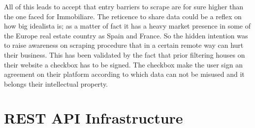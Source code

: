 \documentclass[
  12pt,
  a4paper,
  oneside]{book}
\theoremstyle{definition}
\theoremstyle{definition}
\theoremstyle{definition}
\theoremstyle{remark}
\begin{document}
All of this leads to accept that entry barriers to scrape are for sure higher than the one faced for Immobiliare. The reticence to share data could be a reflex on how big idealista is; as a matter of fact it has a heavy market presence in some of the Europe real estate country as Spain and France. So the hidden intention was to raise awareness on scraping procedure that in a certain remote way can hurt their business. This has been validated by the fact that prior filtering houses on their website a checkbox has to be signed. The checkbox make the user sign an agreement on their platform according to which data can not be misused and it belongs their intellectual property.

\hypertarget{Infrastructure}{%
\chapter{REST API Infrastructure}\label{Infrastructure}}
\end{document}
